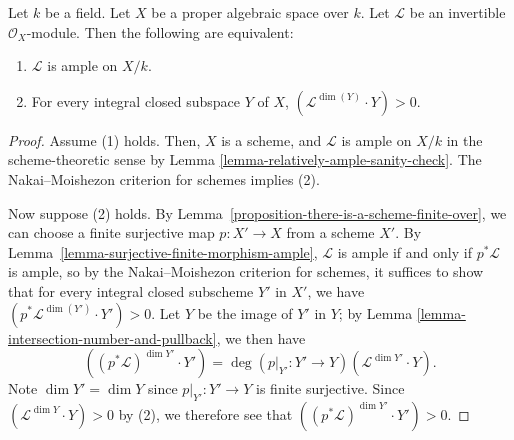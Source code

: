 \begin{theorem}
  Let $k$ be a field. Let $X$ be a proper algebraic space over $k$. Let
  $\mathcal{L}$ be an invertible $\mathcal{O}_X$-module. Then the following are
  equivalent:
  \begin{enumerate}
    \item $\mathcal{L}$ is ample on $X/k$.
    \item For every integral closed subspace $Y$ of $X$, $(\mathcal{L}^{\dim(Y)}
      \cdot Y) > 0$.
  \end{enumerate}
\end{theorem}
\begin{proof}
  Assume (1) holds. Then, $X$ is a scheme, and $\mathcal{L}$ is ample on $X/k$
  in the scheme-theoretic sense by Lemma
  \ref{lemma-relatively-ample-sanity-check}.
  The Nakai--Moishezon criterion for schemes implies (2).

  Now suppose (2) holds.
  By Lemma~\ref{proposition-there-is-a-scheme-finite-over}, we can choose
  a finite surjective map $p : X' \to X$ from a scheme $X'$.
  By Lemma~\ref{lemma-surjective-finite-morphism-ample}, $\mathcal{L}$ is
  ample if and only if $p^*\mathcal{L}$ is ample, so by the Nakai--Moishezon
  criterion for schemes, it suffices to show that for every integral closed
  subscheme $Y'$ in $X'$, we have $(p^*\mathcal{L}^{\dim(Y')} \cdot Y') > 0$.
  Let $Y$ be the image of $Y'$ in $Y$; by Lemma
  \ref{lemma-intersection-number-and-pullback}, we then have
  $$
  ( (p^*\mathcal{L})^{\dim Y'} \cdot Y') = \deg(p\rvert_{Y'} : Y' \to
  Y)(\mathcal{L}^{\dim Y'} \cdot Y).
  $$
  Note $\dim Y' = \dim Y$ since $p\rvert_{Y'} : Y' \to Y$ is finite surjective.
  Since $(\mathcal{L}^{\dim Y} \cdot Y) > 0$ by (2), we therefore see that
  $( (p^*\mathcal{L})^{\dim Y'} \cdot Y') > 0$.
\end{proof}






